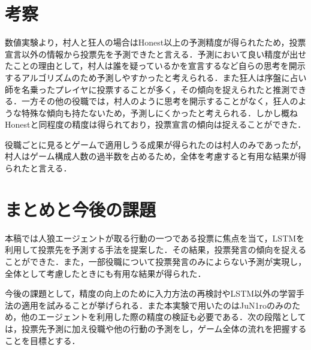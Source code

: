 \documentclass{jarticle}
\begin{document}
\section{考察}
数値実験より，村人と狂人の場合はHonest以上の予測精度が得られたため，投票宣言以外の情報から投票先を予測できたと言える．予測において良い精度が出せたことの理由として，村人は誰を疑っているかを宣言するなど自らの思考を開示するアルゴリズムのため予測しやすかったと考えられる．また狂人は序盤に占い師を名乗ったプレイヤに投票することが多く，その傾向を捉えられたと推測できる．一方その他の役職では，村人のように思考を開示することがなく，狂人のような特殊な傾向も持たないため，予測しにくかったと考えられる．しかし概ねHonestと同程度の精度は得られており，投票宣言の傾向は捉えることができた．\par
役職ごとに見るとゲームで適用しうる成果が得られたのは村人のみであったが，村人はゲーム構成人数の過半数を占めるため，全体を考慮すると有用な結果が得られたと言える．\par

\section{まとめと今後の課題}
本稿では人狼エージェントが取る行動の一つである投票に焦点を当て，LSTMを利用して投票先を予測する手法を提案した．その結果，投票発言の傾向を捉えることができた．また，一部役職について投票発言のみによらない予測が実現し，全体として考慮したときにも有用な結果が得られた．\par
今後の課題として，精度の向上のために入力方法の再検討やLSTM以外の学習手法の適用を試みることが挙げられる．また本実験で用いたのはJuN1roのみのため，他のエージェントを利用した際の精度の検証も必要である．次の段階としては，投票先予測に加え役職や他の行動の予測をし，ゲーム全体の流れを把握することを目標とする．




\end{document}
